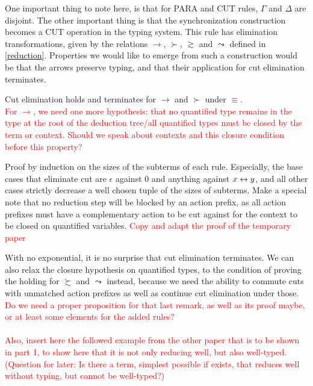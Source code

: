 \begin{definition}
{}
\end{definition}

One important thing to note here, is that for PARA and CUT rules, $\Gamma$ and $\Delta$ are disjoint. The other important thing is that the synchronization construction becomes a CUT operation in the typing system. This rule has elimination transformations, given by the relations $\to$, $\succ$, $\gtrsim$ and $\leadsto$ defined in \ref{reduction}. Properties we would like to emerge from such a construction would be that the arrows preserve typing, and that their application for cut elimination terminates.

\begin{proposition}
Cut elimination holds and terminates for $\to$ and $\succ$ under $\equiv$.\\
\textcolor{red}{For $\to$, we need one more hypothesis: that no quantified type remains in the type at the root of the deduction tree/all quantified types must be closed by the term or context. Should we speak about contexts and this closure condition before this property?} %
\end{proposition}

\begin{myproof}
Proof by induction on the sizes of the subterms of each rule. Especially, the base cases that eliminate cut are $\epsilon$ against 0 and anything against $x \leftrightarrow y$, and all other cases strictly decrease a well chosen tuple of the sizes of subterms. Make a special note that no reduction step will be blocked by an action prefix, as all action prefixes must have a complementary action to be cut against for the context to be closed on quantified variables. \textcolor{red}{Copy and adapt the proof of the temporary paper} %
\end{myproof}

\remark With no exponential, it is no surprise that cut elimination terminates. We can also relax the closure hypothesis on quantified types, to the condition of proving the holding for $\succsim$ and $\leadsto$ instead, because we need the ability to commute cuts with unmatched action prefixes as well as continue cut elimination under those.\\

\textcolor{red}{Do we need a proper proposition for that last remark, as well as its proof maybe, or at least some elements for the added rules?\\~\\
Also, insert here the followed example from the other paper that is to be shown in part 1, to show here that it is not only reducing well, but also well-typed. (Question for later: Is there a term, simplest possible if exists, that reduces well without typing, but cannot be well-typed?)} %